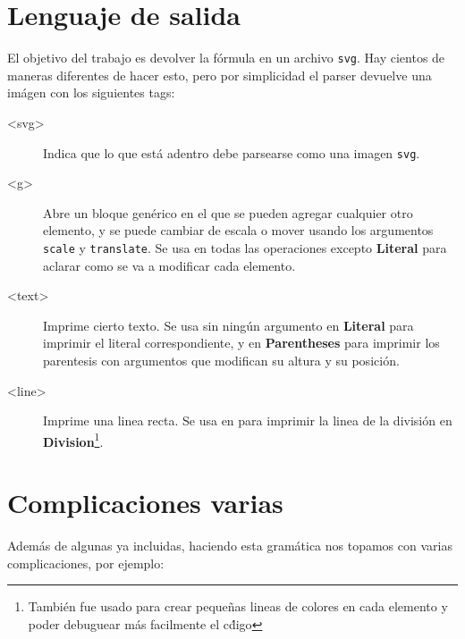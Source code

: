 \documentclass[a4paper, 10pt, twoside]{article}
\begin{document}
\section{Lenguaje de salida}

El objetivo del trabajo es devolver la f\'ormula en un archivo \texttt{svg}. Hay cientos de maneras diferentes de hacer esto, pero por simplicidad el parser devuelve una im\'agen con los siguientes tags:

\begin{description}
\item [<svg>] Indica que lo que est\'a adentro debe parsearse como una imagen \texttt{svg}.
\item [<g>] Abre un bloque gen\'erico en el que se pueden agregar cualquier otro elemento, y se puede cambiar de escala o mover usando los argumentos \texttt{scale} y \texttt{translate}. Se usa en todas las operaciones excepto  \textbf{Literal} para aclarar como se va a modificar cada elemento.
\item [<text>] Imprime cierto texto. Se usa sin ning\'un argumento en \textbf{Literal} para imprimir el literal correspondiente, y en \textbf{Parentheses} para imprimir los parentesis con argumentos que modifican su altura y su posici\'on.
\item [<line>] Imprime una linea recta. Se usa en para imprimir la linea de la divisi\'on en \textbf{Division}\footnote{Tambi\'en fue usado para crear peque\~nas lineas de colores en cada elemento y poder debuguear m\'as facilmente el c\'digo}.
\end{description}

\section{Complicaciones varias}

Adem\'as de algunas ya incluidas, haciendo esta gram\'atica nos topamos con varias complicaciones, por ejemplo:
\end{document}
